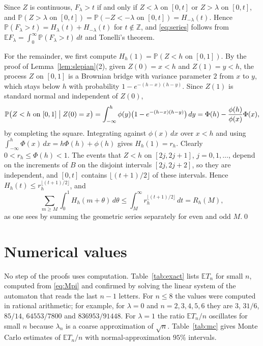 \documentclass[11pt]{amsart}
\theoremstyle{remark}
\numberwithin{equation}{section}
\newcommand{\PP}{\mathbb{P}}
\newcommand{\EE}{\mathbb{E}}
\newcommand{\Z}{\mathbb{Z}}
\begin{document}
Since $Z$ is continuous, $F_\lambda>t$ if and only if $Z<\lambda$ on $[0,t]$ or $Z>\lambda$ on $[0,t]$, and $\PP(Z>\lambda\text{ on }[0,t])=\PP(-Z<-\lambda\text{ on }[0,t])=H_{-\lambda}(t)$. Hence $\PP(F_\lambda>t)=H_\lambda(t)+H_{-\lambda}(t)$ for $t\notin\Z$, and \eqref{eq:series} follows from $\EE F_\lambda=\int_0^\infty\PP(F_\lambda>t)\,dt$ and Tonelli's theorem.

For the remainder, we first compute $H_h(1)=\PP(Z<h\text{ on }[0,1])$. By the proof of Lemma~\ref{lem:slepian}(2), given $Z(0)=x<h$ and $Z(1)=y<h$, the process $Z$ on $[0,1]$ is a Brownian bridge with variance parameter $2$ from $x$ to $y$, which stays below $h$ with probability $1-e^{-(h-x)(h-y)}$. Since $Z(1)$ is standard normal and independent of $Z(0)$,
\[
\PP\bigl(Z<h\text{ on }[0,1]\bigm|Z(0)=x\bigr)=\int_{-\infty}^h\phi(y)\bigl(1-e^{-(h-x)(h-y)}\bigr)\,dy=\Phi(h)-\frac{\phi(h)}{\phi(x)}\Phi(x),
\]
by completing the square. Integrating against $\phi(x)\,dx$ over $x<h$ and using $\int_{-\infty}^h\Phi(x)\,dx=h\Phi(h)+\phi(h)$ gives $H_h(1)=r_h$. Clearly $0<r_h\le\Phi(h)<1$. The events that $Z<h$ on $[2j,2j+1]$, $j=0,1,\dots$, depend on the increments of $B$ on the disjoint intervals $[2j,2j+2]$, so they are independent, and $[0,t]$ contains $\lfloor(t+1)/2\rfloor$ of these intervals. Hence $H_h(t)\le r_h^{\lfloor(t+1)/2\rfloor}$, and
\[
\sum_{m\ge M}\int_0^1H_h(m+\theta)\,d\theta\le\int_M^\infty r_h^{\lfloor(t+1)/2\rfloor}\,dt=R_h(M),
\]
as one sees by summing the geometric series separately for even and odd $M$.\qed

\section{Numerical values}\label{sec:numerics}

No step of the proofs uses computation. Table~\ref{tab:exact} lists $\EE T_n$ for small $n$, computed from \eqref{eq:Mpi} and confirmed by solving the linear system of the automaton that reads the last $n-1$ letters. For $n\le8$ the values were computed in rational arithmetic; for example, for $\lambda=0$ and $n=2,3,4,5,6$ they are $3$, $31/6$, $85/14$, $64553/7800$ and $836953/91448$. For $\lambda=1$ the ratio $\EE T_n/n$ oscillates for small $n$ because $\lambda_n$ is a coarse approximation of $\sqrt n$. Table~\ref{tab:mc} gives Monte Carlo estimates of $\EE T_n/n$ with normal-approximation $95\%$ intervals.
\end{document}
